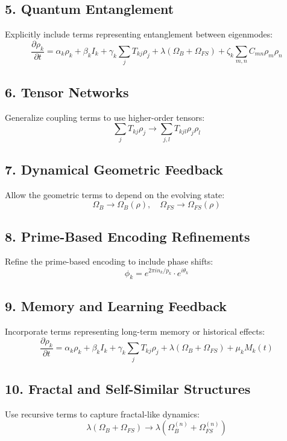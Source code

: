 \documentclass{article}
\theoremstyle{plain}
\theoremstyle{definition}
\begin{document}
\subsection*{5. Quantum Entanglement}
Explicitly include terms representing entanglement between eigenmodes:
\begin{equation}
\frac{\partial \rho_k}{\partial t} = \alpha_k \rho_k + \beta_k I_k + \gamma_k \sum_j T_{kj} \rho_j + \lambda (\Omega_B + \Omega_{FS}) + \zeta_k \sum_{m,n} C_{mn} \rho_m \rho_n
\end{equation}

\subsection*{6. Tensor Networks}
Generalize coupling terms to use higher-order tensors:
\begin{equation}
\sum_j T_{kj} \rho_j \to \sum_{j,l} T_{kjl} \rho_j \rho_l
\end{equation}

\subsection*{7. Dynamical Geometric Feedback}
Allow the geometric terms to depend on the evolving state:
\begin{equation}
\Omega_B \to \Omega_B(\rho), \quad \Omega_{FS} \to \Omega_{FS}(\rho)
\end{equation}

\subsection*{8. Prime-Based Encoding Refinements}
Refine the prime-based encoding to include phase shifts:
\begin{equation}
\phi_k = e^{2\pi i n_k / p_k} \cdot e^{i\theta_k}
\end{equation}

\subsection*{9. Memory and Learning Feedback}
Incorporate terms representing long-term memory or historical effects:
\begin{equation}
\frac{\partial \rho_k}{\partial t} = \alpha_k \rho_k + \beta_k I_k + \gamma_k \sum_j T_{kj} \rho_j + \lambda (\Omega_B + \Omega_{FS}) + \mu_k M_k(t)
\end{equation}

\subsection*{10. Fractal and Self-Similar Structures}
Use recursive terms to capture fractal-like dynamics:
\begin{equation}
\lambda (\Omega_B + \Omega_{FS}) \to \lambda (\Omega_B^{(n)} + \Omega_{FS}^{(n)})
\end{equation}
\end{document}
